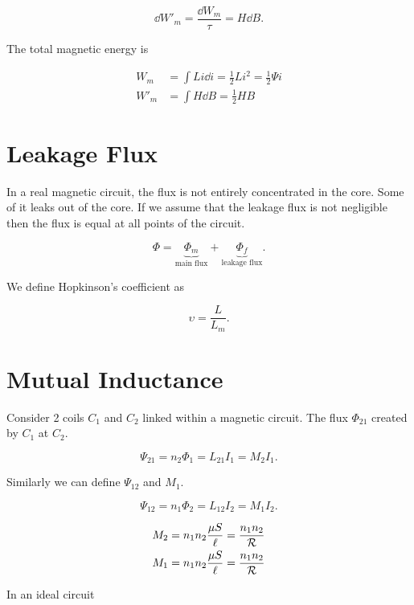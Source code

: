 \documentclass{report}
\begin{document}
\[
	\dd{W'_m} = \frac{\dd{W_m}}{\tau} = H \dd{B}
	.\]

The total magnetic energy is

\begin{align*}
	W_m  & = \int Li \dd{i} = \frac{1}{2} Li^2 = \frac{1}{2} \Psi i \\
	W'_m & = \int H \dd{B} = \frac{1}{2} H B
\end{align*}

\section{Leakage Flux}

In a real magnetic circuit, the flux is not entirely concentrated in the core. Some of it leaks out of the core. If we assume that the leakage flux is not negligible then the flux is equal at all points of the circuit.

\[
	\Phi = \underbrace{\Phi_m}_{\text{main flux}} + \underbrace{\Phi_f}_{\text{leakage flux}}
	.\]


We define Hopkinson's coefficient as

\[
	\upsilon = \frac{L}{L_m}
	.\]

\section{Mutual Inductance}

Consider 2 coils $C_1$ and $C_2$ linked within a magnetic circuit. The flux $\Phi_{21}$ created by $C_1$ at $C_2$.

\[
	\Psi_{21} = n_2 \Phi_{1} = L_{21} I_1 = M_2 I_1
	.\]

Similarly we can define $\Psi_{12}$ and $M_1$.

\[
	\Psi_{12} = n_1 \Phi_{2} = L_{12} I_2 = M_1 I_2
	.\]

\begin{align*}
	M_2 & = n_1 n_2 \frac{\mu S}{\ell} = \frac{n_1 n_2}{\mathcal{R}} \\
	M_1 & = n_1 n_2 \frac{\mu S}{\ell} = \frac{n_1 n_2}{\mathcal{R}}
\end{align*}

In an ideal circuit
\end{document}
